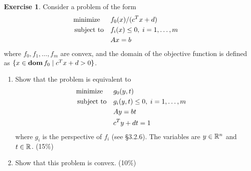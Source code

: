 \documentclass[12pt]{extarticle}
\theoremstyle{definition}
\newtheorem{exercise}{Exercise}
\begin{document}
\begin{exercise}
  Consider a problem of the form
  \begin{align}
    \text{minimize\;\;}\quad& f_0(x)/(c^Tx+d)\nonumber\\
    \text{subject to}  \quad& f_i(x)\le 0,\;i=1,\dots,m\label{eq:3.1}\\
                            & Ax=b\nonumber
  \end{align}
  where $f_0,f_1,\dots,f_m$ are convex, and the domain of the objective function is defined as $\{x\in\mathop{\bf dom} f_0\mid c^Tx+d>0\}$.
  \begin{enumerate}[label=(\alph*)]
    \item Show that the problem is equivalent to
          \begin{align}
            \text{minimize\;\;}\quad& g_0(y,t)\nonumber\\
            \text{subject to}  \quad& g_i(y,t)\le 0,\;i=1,\dots,m\label{eq:3.2}\\
                                    & Ay = bt\nonumber\\
                                    & c^Ty+dt=1\nonumber
          \end{align}
          where $g_i$ is the perspective of $f_i$ (see \S 3.2.6).
          The variables are $y\in\mathbb{R}^n$ and $t\in\mathbb{R}$. (15\%)
    \item Show that this problem is convex. (10\%)
  \end{enumerate}
\end{exercise}
\end{document}
